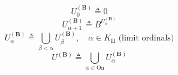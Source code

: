 $$U_0^{(\mathbf{B})} \triangleq 0$$
$$U_{\alpha+1}^{(\mathbf{B})} \triangleq B^{U_{\alpha}^{(\mathbf{B})}}$$
$$U_{\alpha}^{(\mathbf{B})} \triangleq \bigcup_{\beta < \alpha} U_{\beta}^{(\mathbf{B})}, \quad \alpha \in K_{\mathrm{II}}\text{ (limit ordinals)}$$
$$U^{(\mathbf{B})} \triangleq \bigcup_{\alpha \in \mathrm{On}} U_{\alpha}^{(\mathbf{B})}$$
